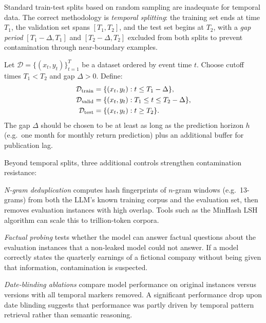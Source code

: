 Standard train-test splits based on random sampling are inadequate for temporal data.
The correct methodology is \emph{temporal splitting}: the training set ends at time
$T_1$, the validation set spans $[T_1, T_2]$, and the test set begins at $T_2$, with
a \emph{gap period} $[T_1 - \Delta, T_1]$ and $[T_2 - \Delta, T_2]$ excluded from
both splits to prevent contamination through near-boundary examples.

\begin{definition}
\label{def:ch13-temporal-split}
Let $\mathcal{D} = \{(x_t, y_t)\}_{t=1}^T$ be a dataset ordered by event time $t$.
Choose cutoff times $T_1 < T_2$ and gap $\Delta > 0$. Define:
\begin{align}
  \mathcal{D}_{\text{train}} &= \{(x_t, y_t) : t \leq T_1 - \Delta\}, \notag \\
  \mathcal{D}_{\text{valid}} &= \{(x_t, y_t) : T_1 \leq t \leq T_2 - \Delta\}, \notag \\
  \mathcal{D}_{\text{test}} &= \{(x_t, y_t) : t \geq T_2\}.
  \label{eq:ch13-temporal-split}
\end{align}
The gap $\Delta$ should be chosen to be at least as long as the prediction horizon $h$ (e.g.\
one month for monthly return prediction) plus an additional buffer for publication lag.
\end{definition}

Beyond temporal splits, three additional controls strengthen contamination resistance:

\emph{N-gram deduplication} computes hash fingerprints of $n$-gram windows (e.g.\ 13-grams)
from both the LLM's known training corpus and the evaluation set, then removes evaluation
instances with high overlap. Tools such as the MinHash LSH algorithm can scale this to
trillion-token corpora.

\emph{Factual probing} tests whether the model can answer factual questions about the
evaluation instances that a non-leaked model could not answer. If a model correctly
states the quarterly earnings of a fictional company without being given that information,
contamination is suspected.

\emph{Date-blinding ablations} compare model performance on original instances versus
versions with all temporal markers removed. A significant performance drop upon date
blinding suggests that performance was partly driven by temporal pattern retrieval
rather than semantic reasoning.

